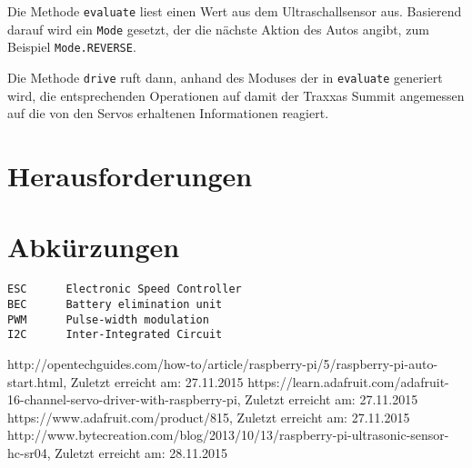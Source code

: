 \documentclass[a4paper,10pt]{scrartcl}
\begin{document}
    Die Methode \lstinline{evaluate} liest einen Wert aus dem Ultraschallsensor
    aus.
    Basierend darauf wird ein \lstinline{Mode} gesetzt, der die nächste Aktion
    des Autos angibt, zum Beispiel \lstinline{Mode.REVERSE}.

    Die Methode \lstinline{drive} ruft dann, anhand des Moduses der in
    \lstinline{evaluate} generiert wird, die entsprechenden Operationen auf
    damit der Traxxas Summit angemessen auf die von den Servos erhaltenen
    Informationen reagiert.

\section{Herausforderungen}

\section{Abkürzungen}
  \begin{lstlisting}
ESC      Electronic Speed Controller
BEC      Battery elimination unit
PWM      Pulse-width modulation
I2C      Inter-Integrated Circuit
  \end{lstlisting}

\begin{thebibliography}{9}
    http://opentechguides.com/how-to/article/raspberry-pi/5/raspberry-pi-auto-start.html,
    Zuletzt erreicht am: 27.11.2015
    https://learn.adafruit.com/adafruit-16-channel-servo-driver-with-raspberry-pi,
    Zuletzt erreicht am: 27.11.2015
    https://www.adafruit.com/product/815,
    Zuletzt erreicht am: 27.11.2015
    http://www.bytecreation.com/blog/2013/10/13/raspberry-pi-ultrasonic-sensor-hc-sr04,
    Zuletzt erreicht am: 28.11.2015
\end{thebibliography}
\end{document}
